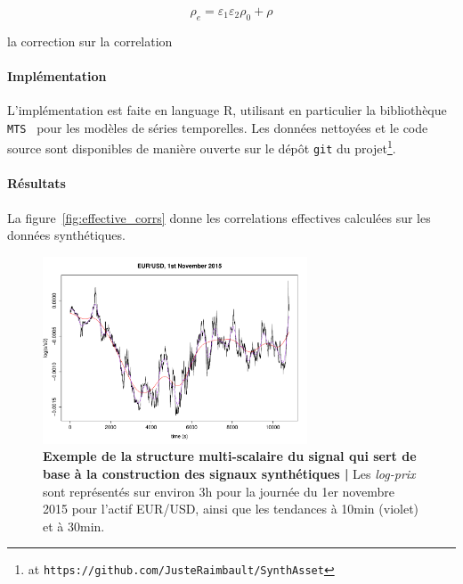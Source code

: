 \begin{equation}
\label{eq:}
\rho_e = \varepsilon_1 \varepsilon_2 \rho_0 + \rho 
\end{equation}

 la correction sur la correlation




\paragraph{Implémentation}

L'implémentation est faite en language R, utilisant en particulier la bibliothèque \texttt{MTS}~\cite{Tsay:2015xy} pour les modèles de séries temporelles. Les données nettoyées et le code source sont disponibles de manière ouverte sur le dépôt \texttt{git} du projet\footnote{at \texttt{https://github.com/JusteRaimbault/SynthAsset}}.

\paragraph{Résultats}

La figure~\ref{fig:effective_corrs} donne les correlations effectives calculées sur les données synthétiques.




\begin{figure}
\centering
\includegraphics[width=0.7\textwidth]{figures/asset/ex_filtering}
\caption{\textbf{Exemple de la structure multi-scalaire du signal qui sert de base à la construction des signaux synthétiques | } Les \emph{log-prix} sont représentés sur environ 3h pour la journée du 1er novembre 2015 pour l'actif EUR/USD, ainsi que les tendances à 10min (violet) et à 30min.}
\label{fig:example_signal}
\end{figure}




